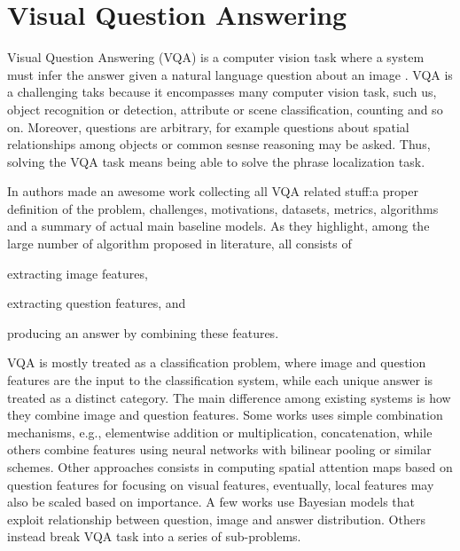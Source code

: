 \section{Visual Question Answering}

Visual Question Answering (VQA) is a computer vision task where a
system must infer the answer given a natural language question about
an image \cite{kafle2017visual}. VQA is a challenging taks because it
encompasses many computer vision task, such us, object recognition or
detection, attribute or scene classification, counting and so on.
Moreover, questions are arbitrary, for example questions about spatial
relationships among objects or common sesnse reasoning may be asked.
Thus, solving the VQA task means being able to solve the phrase
localization task.

In \cite{kafle2017visual} authors made an awesome work collecting all
VQA related stuff:a proper definition of the problem, challenges,
motivations, datasets, metrics, algorithms and a summary of actual
main baseline models. As they highlight, among the large number of
algorithm proposed in literature, all consists of
\begin{enumerate*}[label=(\roman*)] 
  \item extracting image features,
  \item extracting question features, and
  \item producing an answer by combining these features.
\end{enumerate*}
VQA is mostly treated as a classification problem, where image and
question features are the input to the classification system, while
each unique answer is treated as a distinct category. The main
difference among existing systems is how they combine image and
question features. Some works uses simple combination mechanisms,
e.g., elementwise addition or multiplication, concatenation, while
others combine features using neural networks with bilinear pooling or
similar schemes. Other approaches consists in computing spatial
attention maps based on question features for focusing on visual
features, eventually, local features may also be scaled based on
importance. A few works use Bayesian models that exploit relationship
between question, image and answer distribution. Others instead break
VQA task into a series of sub-problems.
